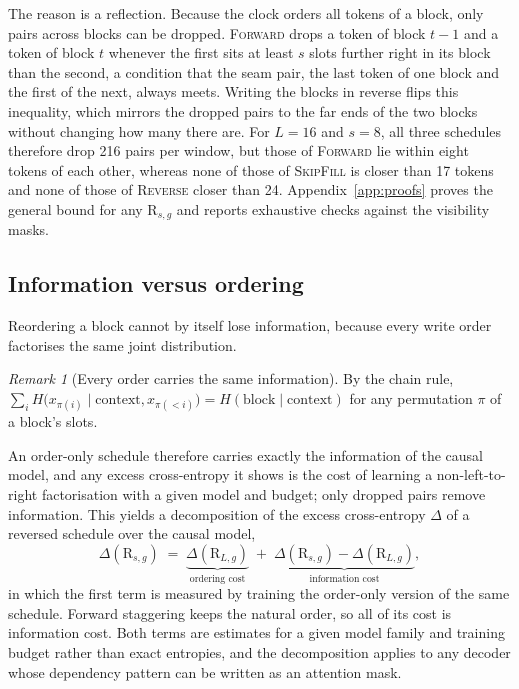 \documentclass{article}
\theoremstyle{definition}
\theoremstyle{remark}
\newtheorem{remark}{Remark}
\newcommand{\name}[1]{\textup{\textsc{#1}}}
\newcommand{\sfill}{\name{SkipFill}\xspace}
\newcommand{\rev}{\name{Reverse}\xspace}
\newcommand{\fwd}{\name{Forward}\xspace}
\newcommand{\Rsg}[2]{\mathrm{R}_{#1,#2}}
\begin{document}
The reason is a reflection.
Because the clock orders all tokens of a block, only pairs across blocks can be dropped.
\fwd drops a token of block $t-1$ and a token of block $t$ whenever the first sits at least $s$ slots further right in its block than the second, a condition that the seam pair, the last token of one block and the first of the next, always meets.
Writing the blocks in reverse flips this inequality, which mirrors the dropped pairs to the far ends of the two blocks without changing how many there are.
For $L=16$ and $s=8$, all three schedules therefore drop 216 pairs per window, but those of \fwd lie within eight tokens of each other, whereas none of those of \sfill is closer than 17 tokens and none of those of \rev closer than 24.
Appendix~\ref{app:proofs} proves the general bound for any $\Rsg{s}{g}$ and reports exhaustive checks against the visibility masks.

\subsection{Information versus ordering}
\label{sec:decomp}

Reordering a block cannot by itself lose information, because every write order factorises the same joint distribution.

\begin{remark}[Every order carries the same information]
\label{rem:chain}
By the chain rule, $\sum_i H\big(x_{\pi(i)}\mid \text{context},x_{\pi(<i)}\big)=H(\text{block}\mid\text{context})$ for any permutation $\pi$ of a block's slots.
\end{remark}

An order-only schedule therefore carries exactly the information of the causal model, and any excess cross-entropy it shows is the cost of learning a non-left-to-right factorisation with a given model and budget; only dropped pairs remove information.
This yields a decomposition of the excess cross-entropy $\Delta$ of a reversed schedule over the causal model,
\begin{equation}
  \Delta(\Rsg{s}{g}) \;=\; \underbrace{\Delta(\Rsg{L}{g})}_{\text{ordering cost}} \;+\; \underbrace{\Delta(\Rsg{s}{g})-\Delta(\Rsg{L}{g})}_{\text{information cost}} ,
  \label{eq:decomp}
\end{equation}
in which the first term is measured by training the order-only version of the same schedule.
Forward staggering keeps the natural order, so all of its cost is information cost.
Both terms are estimates for a given model family and training budget rather than exact entropies, and the decomposition applies to any decoder whose dependency pattern can be written as an attention mask.
\end{document}
